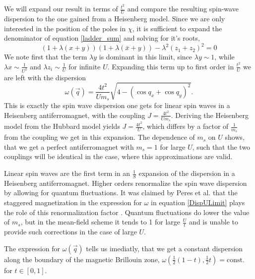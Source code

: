 \documentclass[a4paper,10pt]{report}
\begin{document}
We will expand our result in terms of $\frac{t^2}{U}$ and compare the resulting spin-wave dispersion to the one gained from a Heisenberg model.
Since we are only interested in the position of the poles in $\chi$, it is sufficient to expand the denominator of equation \ref{ladder_sum} and solving for it's roots,
\begin{equation}
 \left(1+\lambda(x+y)\right)\left(1+\lambda(\bar x + y)\right) - \lambda^2(z_1 +z_2)^2 = 0
\end{equation}
We note first that the term $\lambda y$ is dominant in this limit, since $\lambda y \sim 1$, while $\lambda x \sim \frac1{U^2}$ and $\lambda z_i \sim \frac1U$
for infinite $U$.
Expanding this term
up to first order in  $\frac{t^2}U$ we are left with the dispersion
\begin{equation}\label{DispULimit}
 \omega(\vec q) = \frac{4t^2}{Um_s}\sqrt{4-(\cos q_x+\cos q_y)^2}. 
\end{equation}
This is exactly the spin wave dispersion one gets for linear spin waves in a Heisenberg antiferromagnet, 
with the coupling $J=\frac{4t^2}{Um_s}$.
Deriving the Heisenberg model from the Hubbard model yields $J=\frac{4t^2}{U}$, which differs by a factor of $\frac1{m_s}$ from the coupling we get in this expansion.
The dependence of $m_s$ on $U$ shows, that we get a perfect antiferromagnet with $m_s=1$ for large $U$, 
such that the two couplings will be identical in the case, where this approximations are valid. 
%

Linear spin waves are the first term in an $\frac1S$ expansion of the dispersion in a Heisenberg antiferromagnet.
Higher orders renormalize the spin wave dispersion by allowing for quantum fluctuations.
It was claimed by Peres et al. that the staggered magnetization in the expression for $\omega$ in equation \ref{DispULimit} 
plays the role of this renormalization factor \cite{PhysRevB.65.132404}.
Quantum fluctuations do lower the value of $m_s$, but in the mean-field scheme it tends to 1 for large $\frac Ut$ 
and is unable to provide such corrections in the case of large $U$.

The expression for $\omega(\vec q)$ tells us imediatly, that we get a constant dispersion along the 
boundary of the magnetic Brillouin zone, $\omega(\frac12(1-t), \frac12t) =\mathrm{const.}$ for $t \in [0,1]$.
\end{document}
